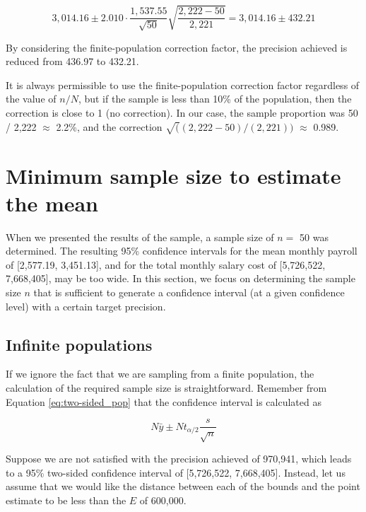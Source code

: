 \begin{equation*}
  3,014.16 \pm 2.010 \cdot \frac{1,537.55}{\sqrt{50}}\sqrt{\frac{2,222 - 50}{2,221}} = 3,014.16 \pm 432.21
\end{equation*}

By considering the finite-population correction factor, the precision achieved is reduced from 436.97 to 432.21. 

It is always permissible to use the finite-population correction factor regardless of the value of $n / N$, but if the sample is less than 10\% of the population, then the correction is close to 1 (no correction). In our case, the sample proportion was 50 / 2,222 $\approx$ 2.2\%, and the correction $\sqrt((2,222 - 50)/(2,221))$ $\approx$ 0.989.



\section{Minimum sample size to estimate the mean} %
\label{sec:estimating_the_sample_size}
When we presented the results of the sample, a sample size of $n =$ 50 was  determined. The resulting 95\% confidence intervals for the mean monthly payroll of [2,577.19, 3,451.13], and for the total monthly salary cost of [5,726,522, 7,668,405], may be too wide. In this section, we focus on determining the sample size $n$ that is sufficient to generate a confidence interval (at a given confidence level) with a certain target precision. 

\subsection{Infinite populations} %
\label{sub:infinite_populations}

If we ignore the fact that we are sampling from a finite population, the calculation of the required sample size is straightforward. Remember from Equation \ref{eq:two-sided_pop} that the confidence interval is calculated as 

\begin{equation*}
  N \bar{y} \pm N t_{\alpha/2} \frac{s}{\sqrt{n}}
\end{equation*}

Suppose we are not satisfied with the precision achieved of 970,941, which leads to a 95\% two-sided confidence interval of [5,726,522, 7,668,405]. Instead, let us assume that we would like the distance between each of the bounds and the point estimate to be less than the  $E$ of 600,000. 

